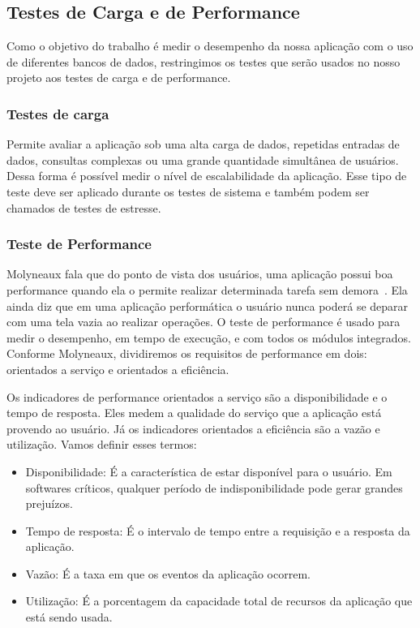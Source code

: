 \subsection{Testes de Carga e de Performance}

Como o objetivo do trabalho é medir o desempenho da nossa aplicação com o uso de diferentes bancos de dados, restringimos os testes que serão usados no nosso projeto aos testes de carga e de performance.

\subsubsection{Testes de carga}

Permite avaliar a aplicação sob uma alta carga de dados, repetidas entradas de dados, consultas complexas ou uma grande quantidade simultânea de usuários. Dessa forma é possível medir o nível de escalabilidade da aplicação. Esse tipo de teste deve ser aplicado durante os testes de sistema e também podem ser chamados de testes de estresse.


\subsubsection{Teste de Performance}

Molyneaux fala que do ponto de vista dos usuários, uma aplicação possui boa performance quando ela o permite realizar determinada tarefa sem demora~\cite{theartoftestperf}. Ela ainda diz que em uma aplicação performática o usuário nunca poderá se deparar com uma tela vazia ao realizar operações. O teste de performance é usado para medir o desempenho, em tempo de execução, e com todos os módulos integrados. Conforme Molyneaux, dividiremos os requisitos de performance em dois: orientados a serviço e orientados a eficiência.

Os indicadores de performance orientados a serviço são a disponibilidade e o tempo de resposta. Eles medem a qualidade do serviço que a aplicação está provendo ao usuário. Já os indicadores orientados a eficiência são a vazão e utilização. Vamos definir esses termos:

\begin{itemize}
\item Disponibilidade: É a característica de estar disponível para o usuário. Em softwares críticos, qualquer período de indisponibilidade pode gerar grandes prejuízos.
\item Tempo de resposta: É o intervalo de tempo entre a requisição e a resposta da aplicação. 
\item Vazão: É a taxa em que os eventos da aplicação ocorrem.
\item Utilização: É a porcentagem da capacidade total de recursos da aplicação que está sendo usada.
\end{itemize}

